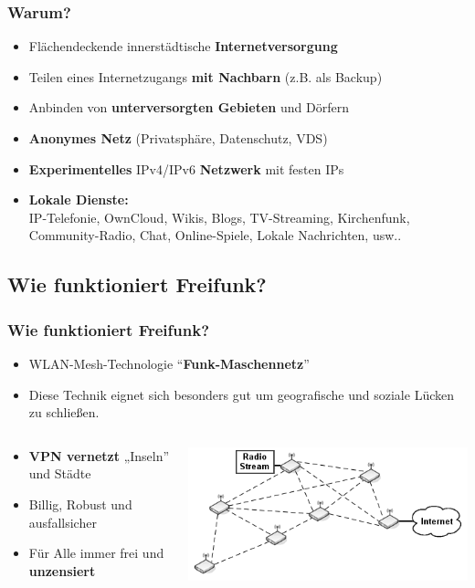\begin{frame}
\frametitle{Warum?}
	\begin{itemize}
		\item Flächendeckende innerstädtische \textbf{Internetversorgung}
		\item Teilen eines Internetzugangs \textbf{mit Nachbarn} (z.B. als Backup)
		\item Anbinden von \textbf{unterversorgten Gebieten} und Dörfern
		\item \textbf{Anonymes Netz} (Privatsphäre, Datenschutz, VDS)
		\item \textbf{Experimentelles }IPv4/IPv6 \textbf{Netzwerk }mit festen IPs
		\item \textbf{Lokale Dienste:} 
		\\ IP-Telefonie, OwnCloud, Wikis, Blogs, TV-Streaming, Kirchenfunk, Community-Radio, Chat, Online-Spiele, Lokale Nachrichten, usw..
	\end{itemize}
\end{frame}


\subsection{Wie funktioniert Freifunk?}

\begin{frame}
\frametitle{Wie funktioniert Freifunk?}
	\begin{itemize}
		\item WLAN-Mesh-Technologie “\textbf{Funk-Maschennetz}”
		\item Diese Technik eignet sich besonders gut um geografische und soziale Lücken zu schließen.
	\end{itemize}
	\begin{columns}[c]   
		\begin{column}[T]{0.4\textwidth}     
			\begin{itemize}
				\item \textbf{VPN vernetzt} „Inseln” und Städte
				\item Billig, Robust und ausfallsicher
				\item Für Alle immer frei und \textbf{unzensiert}
			\end{itemize}
		\end{column} 
		\begin{column}[T]{0.5\textwidth}     
			\includegraphics[width=\textwidth]{images/mesh_uebersicht.png}   
		\end{column}
	\end{columns} 
\end{frame}


